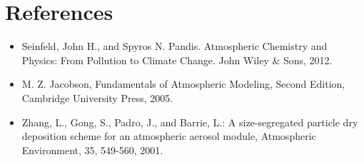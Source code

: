 \documentclass{article}
\begin{document}
\section{References}
\begin{itemize}
\item Seinfeld, John H., and Spyros N. Pandis. Atmospheric Chemistry
  and Physics: From Pollution to Climate Change. John Wiley \& Sons, 2012.
\item M. Z. Jacobson,
Fundamentals of Atmospheric Modeling, Second Edition, Cambridge University Press, 2005.
\item Zhang, L., Gong, S., Padro, J., and Barrie, L.: A size-segregated
    particle dry deposition scheme for an atmospheric aerosol module,
    Atmospheric Environment, 35, 549-560, 2001.
\end{itemize}
\end{document}
